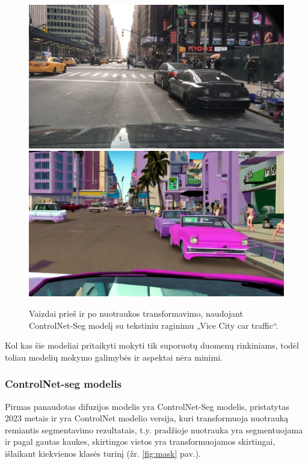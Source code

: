 \documentclass{VUMIFPSbakalaurinis}
\begin{document}
        \begin{figure}[H]
            \centering
            \includegraphics[scale=0.3]{img/diffusion/controlnet/before}
            \includegraphics[scale=0.4287]{img/diffusion/controlnet/after}
            \caption{Vaizdai prieš ir po nuotraukos transformavimo, naudojant ControlNet-Seg modelį su tekstiniu raginimu „Vice City car traffic“.\cite{ControlNetSeg}}
            \label{img:controlnet}
        \end{figure}

        Kol kas šie modeliai pritaikyti mokyti tik suporuotų duomenų rinkiniams, todėl toliau modelių mokymo galimybės ir aspektai nėra minimi. 
        
        \subsubsection{ControlNet-seg modelis}
            Pirmas panaudotas difuzijos modelis yra ControlNet-Seg \cite{ControlNetSeg} modelis, pristatytas 2023 metais ir yra ControlNet modelio \cite{ControlNet} versija, kuri transformuoja nuotrauką remiantis segmentavimo rezultatais, t.y. pradžioje nuotrauka yra segmentuojama ir pagal gautas kaukes, skirtingos vietos yra transformuojamos skirtingai, išlaikant kiekvienos klasės turinį (žr. \ref{fig:mask} pav.).
\end{document}
